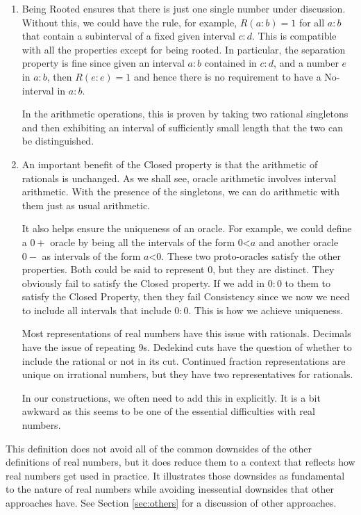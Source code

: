 \documentclass[12pt]{article}
\theoremstyle{remark}
\newcommand{\lt}{\mathord{<}}
\begin{document}
\begin{enumerate}
    \item Being Rooted ensures that there is just one single number under discussion. Without this, we could have the rule, for example, $R(a:b) = 1$ for all $a:b$ that contain a subinterval of a fixed given interval $c:d$. This is compatible with all the properties except for being rooted. In particular, the separation property is fine since given an interval $a:b$ contained in $c:d$, and a number $e$ in $a:b$, then $R(e:e) = 1$ and hence there is no requirement to have a No-interval in $a:b$. 
    
    In the arithmetic operations, this is proven by taking two rational singletons and then exhibiting an interval of sufficiently small length that the two can be distinguished. 

    \item An important benefit of the Closed property is that the arithmetic of rationals is unchanged. As we shall see, oracle arithmetic involves interval arithmetic. With the presence of the singletons, we can do arithmetic with them just as usual arithmetic.
    
    It also helps ensure the uniqueness of an oracle. For example, we could define a $0+$ oracle by being all the intervals of the form $0\lt a$ and another oracle $0-$ as intervals of the form $a \lt 0$. These two proto-oracles satisfy the other properties. Both could be said to represent $0$, but they are distinct. They obviously fail to satisfy the Closed property. If we add in $0:0$ to them to satisfy the Closed Property, then they fail Consistency since we now we need to include all intervals that include $0:0$. This is how we achieve uniqueness. 
    
    Most representations of real numbers have this issue with rationals. Decimals have the issue of repeating 9s. Dedekind cuts have the question of whether to include the rational or not in its cut. Continued fraction representations are unique on irrational numbers, but they have two representatives for rationals. 
    
    In our constructions, we often need to add this in explicitly. It is a bit awkward as this seems to be one of the essential difficulties with real numbers. 

\end{enumerate}


This definition does not avoid all of the common downsides of the other definitions of real numbers, but it does reduce them to a context that reflects how real numbers get used in practice. It illustrates those downsides as fundamental to the nature of real numbers while avoiding inessential downsides that other approaches have. See Section \ref{sec:others} for a discussion of other approaches.  
\end{document}
